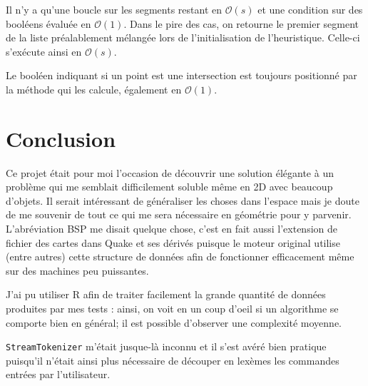 \documentclass[12pt,twocolumn]{article}
\newcommand{\bigO}{\mathcal{O}}
\begin{document}
Il n'y a qu'une boucle sur les segments restant en $\bigO(s)$ et
une condition sur des booléens évaluée en $\bigO(1)$.
Dans le pire des cas, on retourne le premier segment de la liste
préalablement mélangée lors de l'initialisation de l'heuristique.
Celle-ci s'exécute ainsi en $\bigO(s)$.

Le booléen indiquant si un point est une intersection est toujours
positionné par la méthode qui les calcule, également en $\bigO(1)$.


\section{Conclusion}
Ce projet était pour moi l'occasion de découvrir une solution élégante à un
problème qui me semblait difficilement soluble même en 2D avec beaucoup d'objets.
Il serait intéressant de généraliser les choses dans l'espace mais je doute
de me souvenir de tout ce qui me sera nécessaire en géométrie pour y parvenir.
L'abréviation BSP me disait quelque chose, c'est en fait aussi l'extension de
fichier des cartes dans Quake et ses dérivés puisque le moteur original utilise
(entre autres) cette structure de données afin de fonctionner efficacement
même sur des machines peu puissantes.

J'ai pu utiliser R afin de traiter facilement la grande quantité de données
produites par mes tests : ainsi, on voit en un coup d'oeil si un algorithme se
comporte bien en général; il est possible d'observer une complexité moyenne.

\texttt{StreamTokenizer} m'était jusque-là inconnu et il s'est avéré bien
pratique puisqu'il n'était ainsi plus nécessaire de découper en lexèmes
les commandes entrées par l'utilisateur.



\end{document}
